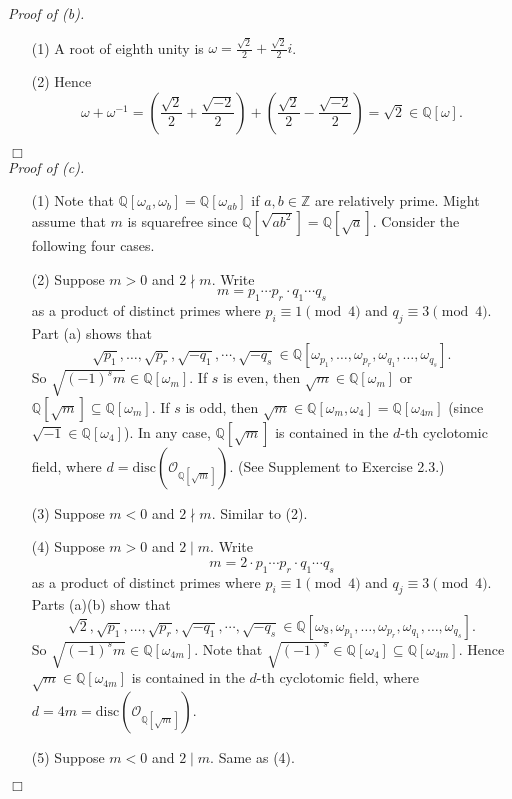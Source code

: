\documentclass{article}
\begin{document}
\emph{Proof of (b).}
\begin{enumerate}
\item[(1)]
  A root of eighth unity is $\omega = \frac{\sqrt{2}}{2} + \frac{\sqrt{2}}{2} i$.

\item[(2)]
  Hence
  \[
    \omega + \omega^{-1}
    = \left( \frac{\sqrt{2}}{2} + \frac{\sqrt{-2}}{2} \right)
        + \left( \frac{\sqrt{2}}{2} - \frac{\sqrt{-2}}{2} \right)
    = \sqrt{2} \in \mathbb{Q}[\omega].
  \]
\end{enumerate} 
$\Box$ \\



\emph{Proof of (c).}
\begin{enumerate}
\item[(1)]
  Note that $\mathbb{Q}[\omega_a, \omega_b] = \mathbb{Q}[\omega_{ab}]$ if
  $a,b \in \mathbb{Z}$ are relatively prime.
  Might assume that $m$ is squarefree since $\mathbb{Q}[\sqrt{ab^2}] = \mathbb{Q}[\sqrt{a}]$.
  Consider the following four cases.

\item[(2)]
  Suppose $m > 0$ and $2 \nmid m$.
  Write
  \[
    m = p_1 \cdots p_r \cdot q_1 \cdots q_s
  \]
  as a product of distinct primes where $p_i \equiv 1 \pmod 4$ and $q_j \equiv 3 \pmod 4$.
  Part (a) shows that
  \[
    \sqrt{p_1}, \ldots, \sqrt{p_r}, \sqrt{-q_1}, \cdots, \sqrt{-q_s}
    \in \mathbb{Q}[\omega_{p_1}, \ldots, \omega_{p_r}, \omega_{q_1}, \ldots, \omega_{q_s}].
  \]
  So $\sqrt{(-1)^s m} \in \mathbb{Q}[\omega_{m}]$.
  If $s$ is even, then $\sqrt{m} \in \mathbb{Q}[\omega_{m}]$ or
  $\mathbb{Q}[\sqrt{m}] \subseteq \mathbb{Q}[\omega_{m}]$.
  If $s$ is odd, then $\sqrt{m} \in \mathbb{Q}[\omega_{m}, \omega_{4}] = \mathbb{Q}[\omega_{4m}]$
  (since $\sqrt{-1} \in \mathbb{Q}[\omega_{4}]$).
  In any case,
  $\mathbb{Q}[\sqrt{m}]$ is contained in the $d$-th cyclotomic field,
  where $d = \mathrm{disc}(\mathcal{O}_{\mathbb{Q}[\sqrt{m}]})$.
  (See Supplement to Exercise 2.3.)

\item[(3)]
  Suppose $m < 0$ and $2 \nmid m$.
  Similar to (2).

\item[(4)]
  Suppose $m > 0$ and $2 \mid m$.
  Write
  \[
    m = 2 \cdot p_1 \cdots p_r \cdot q_1 \cdots q_s
  \]
  as a product of distinct primes where $p_i \equiv 1 \pmod 4$ and $q_j \equiv 3 \pmod 4$.
  Parts (a)(b) show that
  \[
    \sqrt{2}, \sqrt{p_1}, \ldots, \sqrt{p_r}, \sqrt{-q_1}, \cdots, \sqrt{-q_s}
    \in \mathbb{Q}[\omega_8, \omega_{p_1}, \ldots, \omega_{p_r}, \omega_{q_1}, \ldots, \omega_{q_s}].
  \]
  So $\sqrt{(-1)^s m} \in \mathbb{Q}[\omega_{4m}]$.
  Note that $\sqrt{(-1)^s} \in \mathbb{Q}[\omega_{4}] \subseteq \mathbb{Q}[\omega_{4m}]$.
  Hence $\sqrt{m} \in \mathbb{Q}[\omega_{4m}]$ is contained in the $d$-th cyclotomic field,
  where $d = 4m = \mathrm{disc}(\mathcal{O}_{\mathbb{Q}[\sqrt{m}]})$.

\item[(5)]
  Suppose $m < 0$ and $2 \mid m$. Same as (4).
\end{enumerate}
$\Box$ \\\\
\end{document}
